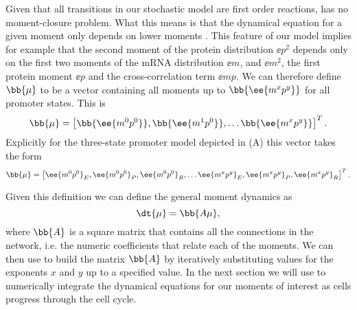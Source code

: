 Given that all transitions in our stochastic model are first order reactions,
 has no moment-closure problem. What this means is that the
dynamical equation for a given moment only depends on lower moments . This feature of our model implies for example that
the second moment of the protein distribution $\ee{p^2}$ depends only on the
first two moments of the mRNA distribution $\ee{m}$, and $\ee{m^2}$, the first
protein moment $\ee{p}$  and the cross-correlation term $\ee{mp}$. We can
therefore define $\bb{\mu}$ to be a vector containing all moments up to
$\bb{\ee{m^x p^y}}$ for all promoter states. This is
\begin{equation}
\bb{\mu} = \left[ \bb{\ee{m^0 p^0}},
								  \bb{\ee{m^1 p^0}},
									\ldots \bb{\ee{m^x p^y}} \right]^T.
\end{equation}
Explicitly for the three-state promoter model depicted in
(A) this vector takes the form
\begin{equation}
	\bb{\mu} = \left[ \ee{m^0 p^0}_E, \ee{m^0 p^0}_P, \ee{m^0 p^0}_R, \ldots
                 \ee{m^x p^y}_E, \ee{m^x p^y}_P, \ee{m^x p^y}_R \right]^T.
\end{equation}

Given this definition we can define the general moment dynamics as
\begin{equation}
\dt{\mu} = \bb{A \mu},
\label{eq_mom_dynamics}
\end{equation}
where $\bb{A}$ is a square matrix that contains all the connections in the
network, i.e. the numeric coefficients that relate each of the moments. We can
then use  to build the matrix $\bb{A}$ by iteratively
substituting values for the exponents $x$ and $y$ up to a specified value. In
the next section we will use  to numerically integrate the
dynamical equations for our moments of interest as cells progress through the
cell cycle.
